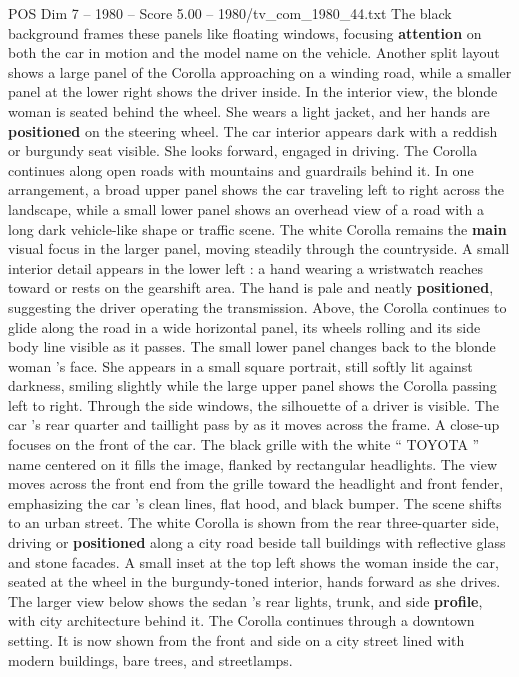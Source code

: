 \begin{textsample}{POS Dim 7 – 1980 – Score 5.00 – 1980/tv\_com\_1980\_44.txt}
The black background frames these panels like floating windows, focusing \textbf{attention} on both the car in motion and the model name on the vehicle.
Another split layout shows a large panel of the Corolla approaching on a winding road, while a smaller panel at the lower right shows the driver inside.
In the interior view, the blonde woman is seated behind the wheel.
She wears a light jacket, and her hands are \textbf{positioned} on the steering wheel.
The car interior appears dark with a reddish or burgundy seat visible.
She looks forward, engaged in driving.
The Corolla continues along open roads with mountains and guardrails behind it.
In one arrangement, a broad upper panel shows the car traveling left to right across the landscape, while a small lower panel shows an overhead view of a road with a long dark vehicle-like shape or traffic scene.
The white Corolla remains the \textbf{main} visual focus in the larger panel, moving steadily through the countryside.
A small interior detail appears in the lower left : a hand wearing a wristwatch reaches toward or rests on the gearshift area.
The hand is pale and neatly \textbf{positioned}, suggesting the driver operating the transmission.
Above, the Corolla continues to glide along the road in a wide horizontal panel, its wheels rolling and its side body line visible as it passes.
The small lower panel changes back to the blonde woman ’s face.
She appears in a small square portrait, still softly lit against darkness, smiling slightly while the large upper panel shows the Corolla passing left to right.
Through the side windows, the silhouette of a driver is visible.
The car ’s rear quarter and taillight pass by as it moves across the frame.
A close-up focuses on the front of the car.
The black grille with the white “ TOYOTA ” name centered on it fills the image, flanked by rectangular headlights.
The view moves across the front end from the grille toward the headlight and front fender, emphasizing the car ’s clean lines, flat hood, and black bumper.
The scene shifts to an urban street.
The white Corolla is shown from the rear three-quarter side, driving or \textbf{positioned} along a city road beside tall buildings with reflective glass and stone facades.
A small inset at the top left shows the woman inside the car, seated at the wheel in the burgundy-toned interior, hands forward as she drives.
The larger view below shows the sedan ’s rear lights, trunk, and side \textbf{profile}, with city architecture behind it.
The Corolla continues through a downtown setting.
It is now shown from the front and side on a city street lined with modern buildings, bare trees, and streetlamps.

\end{textsample}
